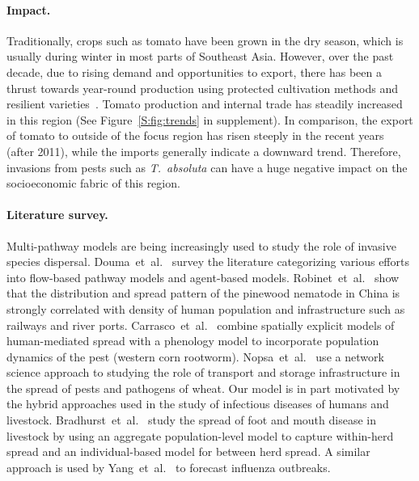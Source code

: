 \documentclass[11pt]{article}
\newcommand{\tuta}{\emph{T.~absoluta}}
\theoremstyle{definition}
\begin{document}
\paragraph{Impact.} Traditionally, crops such as tomato have been grown in
the dry season, which is usually during winter in most parts of Southeast
Asia. However, over the past decade, due to rising demand and opportunities
to export, there has been a thrust towards year-round production using
protected cultivation methods and resilient varieties~\cite{ali2001}.
Tomato production and internal trade has steadily increased in this region
(See Figure~\ref{S:fig:trends} in supplement). In comparison, the export of
tomato to outside of the focus region has risen steeply in the recent years
(after 2011), while the imports generally indicate a downward trend.
Therefore, invasions from pests such as \tuta{} can have a huge negative
impact on the socioeconomic fabric of this region.  %

\paragraph{Literature survey.} Multi-pathway models are being increasingly
used to study the role of invasive species dispersal.
Douma~et~al.~\cite{douma2016pathway} survey the literature categorizing
various efforts into flow-based pathway models and agent-based models.
Robinet~et~al.~\cite{robinet2009role} show that the distribution and spread
pattern of the pinewood nematode in China is strongly correlated with
density of human population and infrastructure such as railways and river
ports.  Carrasco~et~al.~\cite{carrasco2010unveiling} combine spatially
explicit models of human-mediated spread with a phenology model to
incorporate population dynamics of the pest (western corn rootworm).
Nopsa~et~al.~\cite{nopsa2015ecological} use a network science approach to
studying the role of transport and storage infrastructure in the spread of
pests and pathogens of wheat.  Our model is in part motivated by the hybrid
approaches used in the study of infectious diseases of humans and
livestock.  Bradhurst~et~al.~\cite{bradhurst2015hybrid} study the spread of
foot and mouth disease in livestock by using an aggregate population-level
model to capture within-herd spread and an individual-based model for
between herd spread. A similar approach is used by
Yang~et~al.~\cite{yang2016} to forecast influenza outbreaks.
\end{document}
